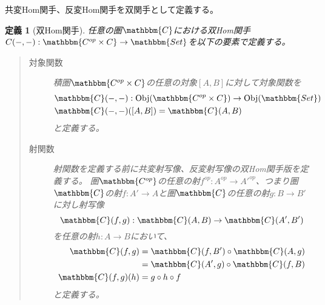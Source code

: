 \documentclass[uplatex,dvipdfmx]{jsarticle}
\newcommand{\cat}[1]{\mathbbm{#1}}
\newcommand{\arrow}{\rightarrow}
\newcommand{\functor}[3]{#1:\cat{#2}\arrow \cat{#3}}
\newcommand{\obj}[1]{\mathrm{Obj}(\cat{#1})}
\newcommand{\mor}[3]{#1:#2\arrow #3}
\newcommand{\arset}[3]{\cat{#1}(#2,#3)}
\newtheorem{define}{定義}[section]
\numberwithin{proof}{subsection}
\numberwithin{prop}{subsection}
\numberwithin{define}{subsection}
\begin{document}
	共変Hom関手、反変Hom関手を双関手として定義する。
	\begin{define}[双Hom関手]
		任意の圏$\cat{C}$における双Hom関手$\functor{C(-,-)}{C^{op}\times C}{Set}$を以下の要素で定義する。
		\begin{quote}
			\begin{description}
				\item[対象関数] 積圏$\cat{C^{op}\times C}$の任意の対象$[A,B]$に対して対象関数を
				\begin{align*}
					&\mor{\arset{C}{-}{-}}{\obj{C^{op}\times C}}{\obj{Set}}\\
					&\arset{C}{-}{-}([A,B])=\arset{C}{A}{B}
				\end{align*}
				と定義する。
				\item[射関数]射関数を定義する前に共変射写像、反変射写像の双Hom関手版を定義する。
				圏$\cat{C^{op}}$の任意の射$\mor{f^{op}}{A^{op}}{A'^{op}}$、つまり圏$\cat{C}$の射$\mor{f}{A'}{A}$と圏$\cat{C}$の任意の射$\mor{g}{B}{B'}$に対し射写像\[\mor{\arset{C}{f}{g}}{\arset{C}{A}{B}}{\arset{C}{A'}{B'}}\]を任意の射$\mor{h}{A}{B}$において、
				\begin{align*}
					\arset{C}{f}{g}&=\arset{C}{f}{B'}\circ\arset{C}{A}{g}\\
					&=\arset{C}{A'}{g}\circ\arset{C}{f}{B}\\
					\arset{C}{f}{g}(h)&=g\circ h\circ f\\
				\end{align*}
				と定義する。

				\begin{center}
				\end{center}


\end{description}
\end{quote}
\end{define}
\end{document}
